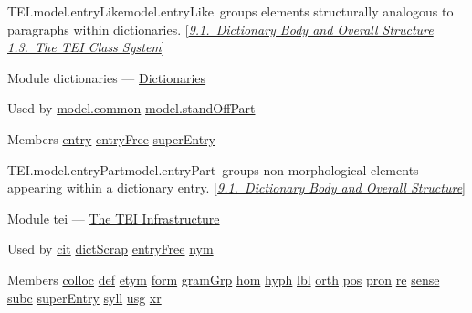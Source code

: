 \begin{reflist}
\item[]\begin{specHead}{TEI.model.entryLike}{model.entryLike} groups elements structurally analogous to paragraphs within dictionaries. [\textit{\hyperref[DIBO]{9.1.\ Dictionary Body and Overall Structure}} \textit{\hyperref[STEC]{1.3.\ The TEI Class System}}]\end{specHead} 
    \item[{Module}]
  dictionaries — \hyperref[DI]{Dictionaries}
    \item[{Used by}]
  \hyperref[TEI.model.common]{model.common} \hyperref[TEI.model.standOffPart]{model.standOffPart}
    \item[{Members}]
  \hyperref[TEI.entry]{entry} \hyperref[TEI.entryFree]{entryFree} \hyperref[TEI.superEntry]{superEntry}
\end{reflist}  
\begin{reflist}
\item[]\begin{specHead}{TEI.model.entryPart}{model.entryPart} groups non-morphological elements appearing within a dictionary entry. [\textit{\hyperref[DIBO]{9.1.\ Dictionary Body and Overall Structure}}]\end{specHead} 
    \item[{Module}]
  tei — \hyperref[ST]{The TEI Infrastructure}
    \item[{Used by}]
  \hyperref[TEI.cit]{cit} \hyperref[TEI.dictScrap]{dictScrap} \hyperref[TEI.entryFree]{entryFree} \hyperref[TEI.nym]{nym}
    \item[{Members}]
  \hyperref[TEI.colloc]{colloc} \hyperref[TEI.def]{def} \hyperref[TEI.etym]{etym} \hyperref[TEI.form]{form} \hyperref[TEI.gramGrp]{gramGrp} \hyperref[TEI.hom]{hom} \hyperref[TEI.hyph]{hyph} \hyperref[TEI.lbl]{lbl} \hyperref[TEI.orth]{orth} \hyperref[TEI.pos]{pos} \hyperref[TEI.pron]{pron} \hyperref[TEI.re]{re} \hyperref[TEI.sense]{sense} \hyperref[TEI.subc]{subc} \hyperref[TEI.superEntry]{superEntry} \hyperref[TEI.syll]{syll} \hyperref[TEI.usg]{usg} \hyperref[TEI.xr]{xr}
\end{reflist}  
